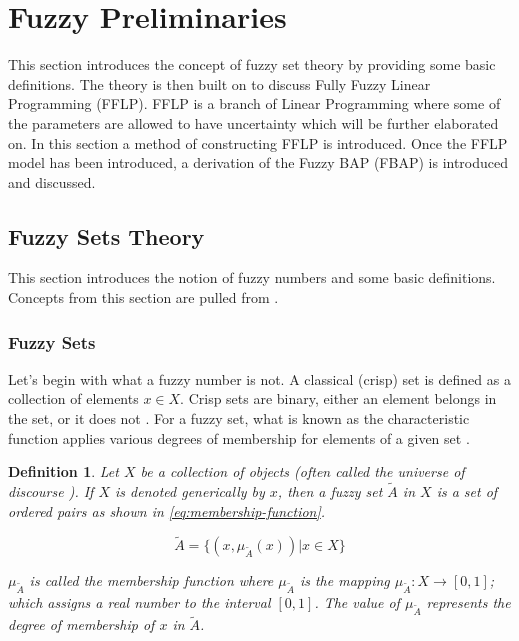 \documentclass[ee,msthesis]{usuthesis}
\newtheorem{definition}{Definition}[section]
\begin{document}
\section{Fuzzy Preliminaries}
\label{sec:fuzzy-preliminaries}
This section introduces the concept of fuzzy set theory by providing some basic definitions. The theory is then built on
to discuss Fully Fuzzy Linear Programming (FFLP). FFLP is a branch of Linear Programming where some of the parameters
are allowed to have uncertainty which will be further elaborated on. In this section a method of constructing FFLP is
introduced. Once the FFLP model has been introduced, a derivation of the Fuzzy BAP (FBAP) is introduced and
discussed.

\subsection{Fuzzy Sets Theory}
\label{sec:fuzzy-sets-theory}
This section introduces the notion of fuzzy numbers and some basic definitions. Concepts from this section are pulled
from \cite{zimmermann-2001-fuzzy-set,das-2016-mathem-model,yaghobi-2014-compar-fuzzy,bello-2019-fuzzy-activ}.

\subsubsection{Fuzzy Sets}
\label{sec:orgb1c236f}
Let's begin with what a fuzzy number is not. A classical (crisp) set is defined as a collection of elements \(x \in X\).
Crisp sets are binary, either an element belongs in the set, or it does not \cite{zimmermann-2001-fuzzy-set}. For a
fuzzy set, what is known as the characteristic function applies various degrees of membership for elements of a given
set \cite{zimmermann-2001-fuzzy-set}.

\begin{definition}
Let \(X\) be a collection of objects (often called the universe of discourse \cite{bello-2019-fuzzy-activ}). If \(X\) is denoted
generically by \(x\), then a fuzzy set \(\tilde{A}\) in \(X\) is a set of ordered pairs as shown in \ref{eq:membership-function}.

\begin{equation}
\label{eq:membership-function}
\tilde{A} = \{(x, \mu_{\tilde{A}}(x))| x\in X\}
\end{equation}

\noindent
\(\mu_{\tilde{A}}\) is called the membership function where \(\mu_{\tilde{A}}\) is the mapping \(\mu_{\tilde{A}} : X \rightarrow
[0,1]\); which assigns a real number to the interval \([0,1]\). The value of \(\mu_{\tilde{A}}\) represents the degree of
membership of \(x\) in \(\tilde{A}\).
\end{definition}
\end{document}
